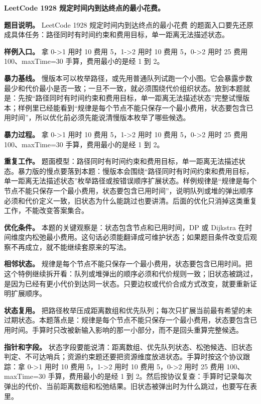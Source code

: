 \noindent\textbf{LeetCode 1928 规定时间内到达终点的最小花费。}

\textbf{题目说明。} LeetCode 1928 规定时间内到达终点的最小花费 的题面入口要先还原成具体任务：路径同时有时间约束和费用目标，单一距离无法描述状态。

\textbf{样例入口。} 拿 0->1 用时 10 费用 5，1->2 用时 10 费用 5，0->2 用时 25 费用 100、maxTime=30 手算，费用最小的是经 1 到 2。

\textbf{暴力基线。} 慢版本可以枚举路径，或先用普通队列试跑一个小图。它会暴露步数最少和代价最小是否一致；一旦不一致，就必须围绕代价组织状态。放到本题就是：先按“路径同时有时间约束和费用目标，单一距离无法描述状态”完整试慢版本；样例里已经能看到“规律是每个节点不能只保存一个最小费用，状态要包含已用时间”，所以优化前必须先能说清慢版本枚举了哪些候选。

\textbf{暴力过程。} 拿 0->1 用时 10 费用 5，1->2 用时 10 费用 5，0->2 用时 25 费用 100、maxTime=30 手算，费用最小的是经 1 到 2。

\textbf{重复工作。} 题面模型：路径同时有时间约束和费用目标，单一距离无法描述状态。暴力版的慢点要落到本题：慢版本会围绕“路径同时有时间约束和费用目标，单一距离无法描述状态”枚举路径或按错误顺序扩展状态。样例规律是“规律是每个节点不能只保存一个最小费用，状态要包含已用时间”，说明队列或堆的弹出顺序必须和代价定义一致，旧状态为什么能跳过也要讲清。后面的优化只消掉这类重复工作，不能改变答案集合。

\textbf{优化条件。} 本题的关键观察是：状态包含节点和已用时间，DP 或 Dijkstra 在时间维度内松弛最小费用。这句话必须能翻译成可维护状态；如果题目条件改变后观察不再成立，就不能继续套原来的写法。

\textbf{相邻状态。} 规律是每个节点不能只保存一个最小费用，状态要包含已用时间。把这个特例继续拆开看：队列或堆弹出的顺序必须和代价规则一致；旧状态被跳过，是因为已经有更小代价到达同一状态。只要边权或代价合成方式改变，就要重新证明扩展顺序。

\textbf{状态复用。} 把路径枚举压成距离数组和优先队列；每次只扩展当前最有希望的未过期状态。本题落点是：规律是每个节点不能只保存一个最小费用，状态要包含已用时间。手算时只改被新输入影响的那一小部分，而不是回头重算完整候选。

\textbf{指针和字段。} 状态字段要能说清：距离数组、优先队列状态、松弛候选、旧状态判定、不可达哨兵；资源约束题还要把资源维度放进状态。手算时按这个协议跟踪：拿 0->1 用时 10 费用 5，1->2 用时 10 费用 5，0->2 用时 25 费用 100、maxTime=30 手算，费用最小的是经 1 到 2。然后按协议复查：手算时记录每次弹出的代价、当前距离数组和松弛结果。旧状态被弹出时为什么跳过，也要写在表里。

